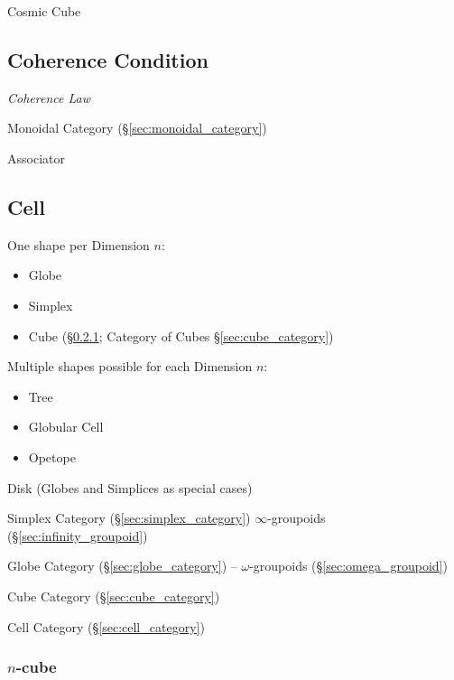 Cosmic Cube %



\subsection{Coherence Condition}\label{sec:coherence_condition}

\emph{Coherence Law}

Monoidal Category (\S\ref{sec:monoidal_category})

Associator



\subsection{Cell}\label{sec:cell}

One shape per Dimension $n$:
\begin{itemize}
  \item Globe
  \item Simplex
  \item Cube (\S\ref{sec:cellular_n_cube}; \fist Category of Cubes
    \S\ref{sec:cube_category})
\end{itemize}

Multiple shapes possible for each Dimension $n$:
\begin{itemize}
  \item Tree
  \item Globular Cell
  \item Opetope
\end{itemize}

Disk (Globes and Simplices as special cases)

\fist Simplex Category (\S\ref{sec:simplex_category})
$\infty$-groupoids (\S\ref{sec:infinity_groupoid})

\fist Globe Category (\S\ref{sec:globe_category}) --
$\omega$-groupoids (\S\ref{sec:omega_groupoid})

\fist Cube Category (\S\ref{sec:cube_category})

\fist Cell Category (\S\ref{sec:cell_category})



\subsubsection{$n$-cube}\label{sec:cellular_n_cube}

